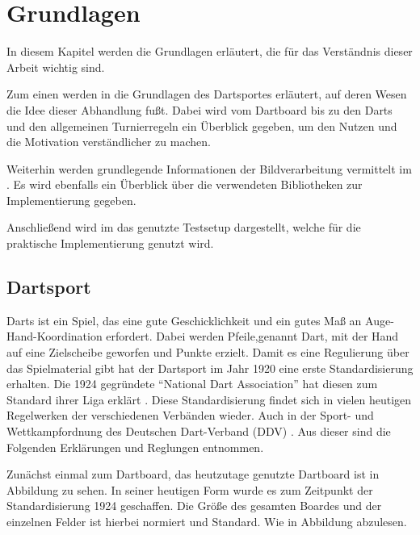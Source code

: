 
\chapter{Grundlagen}
\label{chap:fundamentals}
In diesem Kapitel werden die Grundlagen erläutert, die für das Verständnis dieser Arbeit wichtig sind. 

Zum einen werden in  die Grundlagen des Dartsportes erläutert, auf deren Wesen die Idee dieser Abhandlung fußt. Dabei wird vom Dartboard bis zu den Darts und den allgemeinen Turnierregeln ein Überblick gegeben, um den Nutzen und die Motivation verständlicher zu machen.

Weiterhin werden grundlegende Informationen der Bildverarbeitung vermittelt im . Es wird ebenfalls ein Überblick über die verwendeten Bibliotheken zur Implementierung gegeben.

Anschließend wird im  das genutzte Testsetup dargestellt, welche für die praktische Implementierung genutzt wird.
\section{Dartsport}
\label{sec:darts}
Darts ist ein Spiel, das eine gute Geschicklichkeit und ein gutes Maß an Auge-Hand-Koordination erfordert. Dabei werden Pfeile,genannt Dart, mit der Hand auf eine Zielscheibe geworfen und Punkte erzielt. Damit es eine Regulierung über das Spielmaterial gibt hat der Dartsport im Jahr 1920 eine erste Standardisierung erhalten. Die 1924 gegründete "`National Dart Association"' hat diesen zum Standard ihrer Liga erklärt \autocite[5]{guide2013}. Diese Standardisierung findet sich in vielen heutigen Regelwerken der verschiedenen Verbänden wieder. Auch in der Sport- und Wettkampfordnung des Deutschen
Dart-Verband (DDV) \autocite{DartsRegel2016}. Aus dieser sind die Folgenden Erklärungen und Reglungen entnommen. 

Zunächst einmal zum Dartboard, das heutzutage genutzte Dartboard ist in Abbildung zu sehen. In seiner heutigen Form wurde es zum Zeitpunkt der Standardisierung 1924 geschaffen. Die Größe des gesamten Boardes und der einzelnen Felder ist hierbei normiert und Standard. Wie in Abbildung  abzulesen. 

